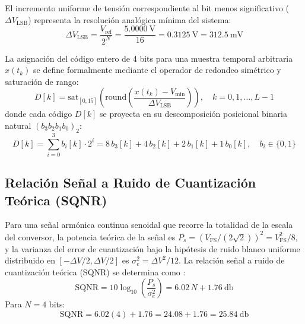 \documentclass[11pt,letterpaper]{article}
\begin{document}
El incremento uniforme de tensión correspondiente al bit menos significativo ($\Delta V_{\text{LSB}}$) representa la resolución analógica mínima del sistema:
\begin{equation}
\Delta V_{\text{LSB}} = \frac{V_{\text{ref}}}{2^N} = \frac{\SI{5.0000}{\volt}}{16} = \SI{0.3125}{\volt} = \SI{312.5}{\milli\volt}
\label{eq:lsb_teorico}
\end{equation}

La asignación del código entero de 4 bits para una muestra temporal arbitraria $x(t_k)$ se define formalmente mediante el operador de redondeo simétrico y saturación de rango:
\begin{equation}
D[k] = \mathrm{sat}_{[0,15]} \left( \mathrm{round}\left( \frac{x(t_k) - V_{\text{min}}}{\Delta V_{\text{LSB}}} \right) \right), \quad k = 0, 1, \dots, L-1
\label{eq:cuantizador}
\end{equation}
donde cada código $D[k]$ se proyecta en su descomposición posicional binaria natural $(b_3 b_2 b_1 b_0)_2$:
\begin{equation}
D[k] = \sum_{i=0}^{3} b_i [k] \cdot 2^i = 8\,b_3[k] + 4\,b_2[k] + 2\,b_1[k] + 1\,b_0[k], \quad b_i \in \{0, 1\}
\label{eq:binario_posicional}
\end{equation}

\subsection{Relación Señal a Ruido de Cuantización Teórica (SQNR)}
Para una señal armónica continua senoidal que recorre la totalidad de la escala del conversor, la potencia teórica de la señal es $P_s = (V_{\text{FS}} / (2\sqrt{2}))^2 = V_{\text{FS}}^2 / 8$, y la varianza del error de cuantización bajo la hipótesis de ruido blanco uniforme distribuido en $[-\Delta V/2, \Delta V/2]$ es $\sigma_e^2 = \Delta V^2 / 12$. La relación señal a ruido de cuantización teórica (SQNR) se determina como \cite{proakis2007}:
\begin{equation}
\mathrm{SQNR} = 10\log_{10}\left( \frac{P_s}{\sigma_e^2} \right) = 6.02\,N + \SI{1.76}{\decibel}
\label{eq:sqnr_formula}
\end{equation}
Para $N = 4$ bits:
\begin{equation}
\mathrm{SQNR} = 6.02(4) + 1.76 = 24.08 + 1.76 = \SI{25.84}{\decibel}
\end{equation}
\end{document}
